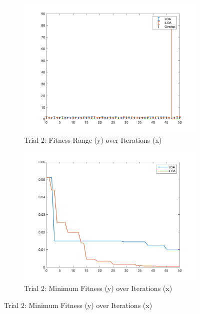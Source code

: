 \begin{figure}
  \begin{subfigure}[b]{0.4\textwidth}
    \includegraphics[width=\textwidth]{img/bars/f2/2}
    \caption{ \scriptsize Trial 2: Fitness Range (y) over Iterations (x)}
    \label{fig:f2-b-2}
  \end{subfigure}
  \begin{subfigure}[b]{0.4\textwidth}
    \includegraphics[width=\textwidth]{img/fits/f2/2}
    \caption{ \scriptsize Trial 2: Minimum Fitness (y) over Iterations (x)}
    \label{fig:f2-f-2}
  \end{subfigure}


\end{figure}

